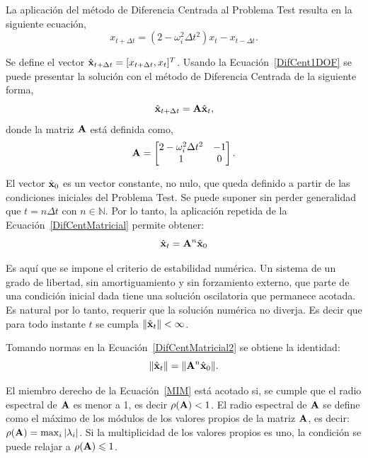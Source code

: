 La aplicación del método de Diferencia Centrada al Problema Test resulta en la siguiente ecuación,
%
\begin{equation}\label{DifCent1DOF}
	x_{t+\Delta t} = (2-\omega_i^2 \Delta t^2)x_t - x_{t-\Delta t}.
\end{equation}

Se define el vector $\hat{{\bf x}}_{t+\Delta t} = [x_{t+\Delta t}, x_t]^T$. Usando la Ecuación~\eqref{DifCent1DOF} se puede presentar la solución con el método de Diferencia Centrada de la siguiente forma,
%
\begin{equation}\label{DifCentMatricial}
\hat{{\bf x}}_{t+\Delta t} = {\bf A} \hat{{\bf x}}_{t},
\end{equation}
donde la matriz ${\bf A}$ está definida como,
%
\begin{equation}\label{MatrizA}
{\bf A} = \left[\begin{matrix}
2-\omega_i^2 \Delta t^2 & -1 \\
1 & 0 \\
\end{matrix}
\right].
\end{equation}

El vector $\hat{{\bf x}}_{0}$ es un vector constante, no nulo, que queda definido a partir de las condiciones iniciales del Problema Test. %
%
Se puede suponer sin perder generalidad que $t=n \Delta t$ con $n\in \mathbb{N}$. Por lo tanto, la aplicación repetida de la Ecuación~\eqref{DifCentMatricial} permite obtener:
%
\begin{equation}\label{DifCentMatricial2}
\hat{{\bf x}}_{t} = {\bf A}^n \hat{{\bf x}}_{0}
\end{equation}

Es aquí que se impone el criterio de estabilidad numérica. Un sistema de un grado de libertad, sin amortiguamiento y sin forzamiento externo, que parte de una condición inicial dada tiene una solución oscilatoria que permanece acotada. Es natural por lo tanto, requerir que la solución numérica no diverja. Es decir que para todo instante $t$ se cumpla $\|\hat{{\bf x}}_t\|<\infty$.

Tomando normas en la Ecuación~\eqref{DifCentMatricial2} se obtiene la identidad:
%
\begin{equation}\label{MIM}
\|\hat{{\bf x}}_{t}\| = \|{\bf A}^n \hat{{\bf x}}_{0}\|.
\end{equation}

El miembro derecho de la Ecuación~\eqref{MIM} está acotado si, se cumple que el radio espectral de ${\bf A}$ es menor a 1, es decir $\rho({\bf A})<1$. %
%
El radio espectral de ${\bf A}$ se define como el máximo de los módulos de los valores propios de la matriz ${\bf A}$, es decir: $\rho({\bf A})=\max_i |\lambda_i|$. Si la multiplicidad de los valores propios es uno, la condición se puede relajar a $\rho({\bf A})\leqslant 1$.

